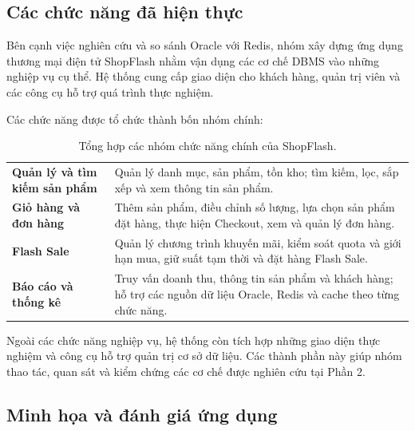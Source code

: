 
\subsection{Các chức năng đã hiện thực}\label{sec:implemented-features}

Bên cạnh việc nghiên cứu và so sánh Oracle với Redis, nhóm xây dựng ứng dụng thương mại điện tử ShopFlash nhằm vận dụng các cơ chế DBMS vào những nghiệp vụ cụ thể. Hệ thống cung cấp giao diện cho khách hàng, quản trị viên và các công cụ hỗ trợ quá trình thực nghiệm.

Các chức năng được tổ chức thành bốn nhóm chính:

\begin{table}[!htbp]
\centering
\caption{Tổng hợp các nhóm chức năng chính của ShopFlash.}\label{tab:impl-features}
\reporttablesetup
\begin{tabularx}{\linewidth}{|P{4cm}|L|}
\hline
{}
 &  \\ \hline
\textbf{Quản lý và tìm kiếm sản phẩm} & Quản lý danh mục, sản phẩm, tồn kho; tìm kiếm, lọc, sắp xếp và xem thông tin sản phẩm. \\ \hline
\textbf{Giỏ hàng và đơn hàng} & Thêm sản phẩm, điều chỉnh số lượng, lựa chọn sản phẩm đặt hàng, thực hiện Checkout, xem và quản lý đơn hàng. \\ \hline
\textbf{Flash Sale} & Quản lý chương trình khuyến mãi, kiểm soát quota và giới hạn mua, giữ suất tạm thời và đặt hàng Flash Sale. \\ \hline
\textbf{Báo cáo và thống kê} & Truy vấn doanh thu, thông tin sản phẩm và khách hàng; hỗ trợ các nguồn dữ liệu Oracle, Redis và cache theo từng chức năng. \\ \hline
\end{tabularx}
\end{table}


Ngoài các chức năng nghiệp vụ, hệ thống còn tích hợp những giao diện thực nghiệm và công cụ hỗ trợ quản trị cơ sở dữ liệu. Các thành phần này giúp nhóm thao tác, quan sát và kiểm chứng các cơ chế được nghiên cứu tại Phần 2.

\subsection{Minh họa và đánh giá ứng dụng}\label{sec:application-evaluation}

